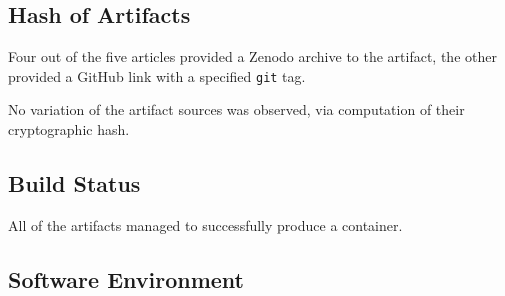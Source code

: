 \documentclass[sigconf,natbib=false]{acmart}
\newcommand{\df}{\texttt{Dockerfile}}
\begin{document}
\subsection{Hash of Artifacts}

Four out of the five articles provided a Zenodo archive to the artifact, the other provided a GitHub link with a specified \texttt{git} tag.

No variation of the artifact sources was observed, via computation of their cryptographic hash.

\subsection{Build Status}

All of the artifacts managed to successfully produce a container.

\subsection{Software Environment}

\begin{table}
  \centering
  \caption{Information about the \df s from the study.}\label{tab:info}
\end{table}
\end{document}
